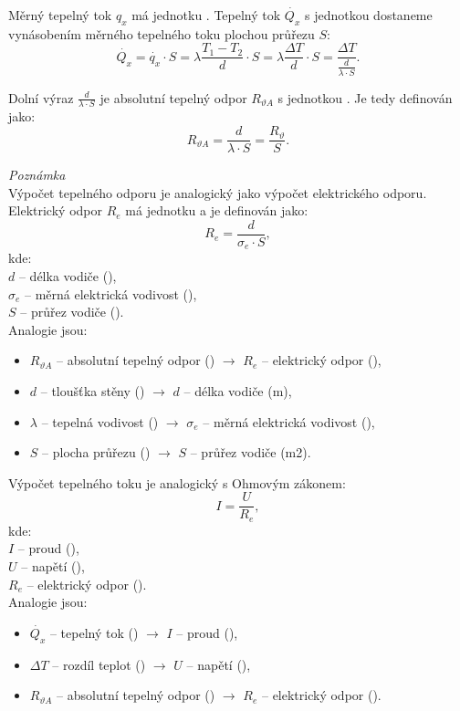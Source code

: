 \documentclass{article}
\begin{document}
Měrný tepelný tok $q_x$ má jednotku \ueqWandMinvsq. Tepelný tok $\dot{Q_x}$ s jednotkou \ueqW \fs dostaneme vynásobením měrného tepelného toku plochou průřezu $S$:
$$
    \dot{Q_x} = \dot{q_x} \cdot S = \lambda \frac{T_1 - T_2}{d} \cdot S = \lambda \frac{\Delta T}{d} \cdot S = \frac{\Delta T}{\frac{d}{\lambda \cdot S}}.
$$

Dolní výraz $\frac{d}{\lambda \cdot S}$ je absolutní tepelný odpor $R_{\vartheta A}$ s jednotkou \ueqKandWinv. Je tedy definován jako:
$$
    R_{\vartheta A} = \frac{d}{\lambda \cdot S} = \frac{R_{\vartheta}}{S}.
$$

\textit{Poznámka}\\

Výpočet tepelného odporu je analogický jako výpočet elektrického odporu. Elektrický odpor $R_e$ má jednotku \ueqOHM \fs a je definován jako:
$$
    R_e = \frac{d}{\sigma_e \cdot S},
$$
kde:\\
$d$ -- délka vodiče (\ueqM),\\
$\sigma_e$ -- měrná elektrická vodivost (\ueqSIEandMinv),\\
$S$ -- průřez vodiče (\ueqMsq).\\

Analogie jsou:
\begin{itemize}
    \item $R_{\vartheta A}$ -- absolutní tepelný odpor (\ueqKandWinv) $\rightarrow$ $R_e$ -- elektrický odpor (\ueqOHM),
    \item $d$ -- tloušťka stěny (\ueqM) $\rightarrow$ $d$ -- délka vodiče (m),
    \item $\lambda$ -- tepelná vodivost (\ueqWandMinvKinv) $\rightarrow$ $\sigma_e$ -- měrná elektrická vodivost (\ueqSIEandMinv),
    \item $S$ -- plocha průřezu (\ueqMsq) $\rightarrow$ $S$ -- průřez vodiče (m2).
\end{itemize}

Výpočet tepelného toku je analogický s Ohmovým zákonem:
$$
    I = \frac{U}{R_e},
$$
kde:\\
$I$ -- proud (\ueqA),\\
$U$ -- napětí (\ueqV),\\
$R_e$ -- elektrický odpor (\ueqOHM).\\

Analogie jsou:
\begin{itemize}
    \item $\dot{Q_x}$ -- tepelný tok (\ueqW) $\rightarrow$ $I$ -- proud (\ueqA),
    \item $\Delta T$ -- rozdíl teplot (\ueqK) $\rightarrow$ $U$ -- napětí (\ueqV),
    \item $R_{\vartheta A}$ -- absolutní tepelný odpor (\ueqKandWinv) $\rightarrow$ $R_e$ -- elektrický odpor (\ueqOHM).
\end{itemize}
\end{document}
